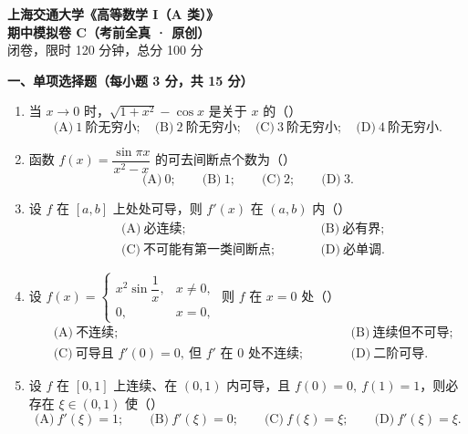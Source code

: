 \documentclass[11pt,a4paper]{ctexart}
\begin{document}
\begin{center}
  {\LARGE\bfseries 上海交通大学《高等数学 I（A 类）》}\\[4pt]
  {\Large\bfseries 期中模拟卷 C（考前全真 · 原创）}\\[8pt]
  {\kaishu 闭卷，限时 120 分钟，总分 100 分}
\end{center}

\vspace{2pt}

\vspace{6pt}
\noindent\textbf{一、单项选择题（每小题 3 分，共 15 分）}

\begin{enumerate}[label=\textbf{\arabic*.},leftmargin=2.2em,itemsep=7pt]

\item 当 $x\to0$ 时，$\sqrt{1+x^2}-\cos x$ 是关于 $x$ 的\quad（\qquad）
\[
\text{(A)}\ 1\ \text{阶无穷小};\quad \text{(B)}\ 2\ \text{阶无穷小};\quad
\text{(C)}\ 3\ \text{阶无穷小};\quad \text{(D)}\ 4\ \text{阶无穷小}.
\]

\item 函数 $f(x)=\dfrac{\sin\pi x}{x^2-x}$ 的可去间断点个数为\quad（\qquad）
\[
\text{(A)}\ 0;\qquad \text{(B)}\ 1;\qquad \text{(C)}\ 2;\qquad \text{(D)}\ 3.
\]

\item 设 $f$ 在 $[a,b]$ 上处处可导，则 $f'(x)$ 在 $(a,b)$ 内\quad（\qquad）
\[
\begin{aligned}
&\text{(A)}\ \text{必连续};\qquad &&\text{(B)}\ \text{必有界};\\
&\text{(C)}\ \text{不可能有第一类间断点};\qquad &&\text{(D)}\ \text{必单调}.
\end{aligned}
\]

\item 设 $f(x)=\begin{cases}x^2\sin\dfrac1x,&x\ne0,\\[3pt] 0,&x=0,\end{cases}$ 则 $f$ 在 $x=0$ 处\quad（\qquad）
\[
\begin{aligned}
&\text{(A)}\ \text{不连续};\qquad &&\text{(B)}\ \text{连续但不可导};\\
&\text{(C)}\ \text{可导且 } f'(0)=0,\ \text{但 } f' \text{ 在 } 0 \text{ 处不连续};\qquad &&\text{(D)}\ \text{二阶可导}.
\end{aligned}
\]

\item 设 $f$ 在 $[0,1]$ 上连续、在 $(0,1)$ 内可导，且 $f(0)=0,\ f(1)=1$，则必存在 $\xi\in(0,1)$ 使\quad（\qquad）
\[
\text{(A)}\ f'(\xi)=1;\qquad \text{(B)}\ f'(\xi)=0;\qquad
\text{(C)}\ f(\xi)=\xi;\qquad \text{(D)}\ f'(\xi)=\xi.
\]

\end{enumerate}
\end{document}
